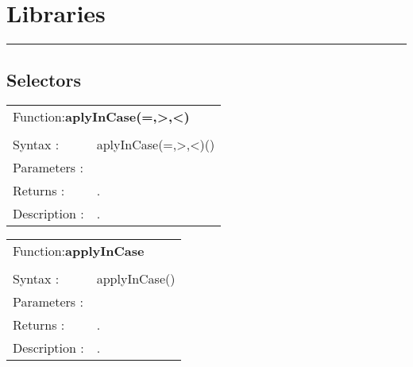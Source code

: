 \documentclass[a4paper,11pt,oneside]{article}
\begin{document}
\vspace{1cm}
\sffamily
\newpage
\section{Libraries}


\vspace{5mm}
\rule{16cm}{2pt}
\subsection{Selectors}



\vspace{2mm}
\hline
\vspace{1mm}
\begin{tabular}{p{2.5cm} p{12cm}}
   
    \multicolumn{2}{l}{Function:\textbf{aplyInCase(=,>,<)}}\\
	 & \\
    Syntax : & aplyInCase(=,>,<)()\\
    Parameters : & 
\begin{itemize}

\end{itemize}\\
	
    Returns : & .\\
    Description : & .\\
\end{tabular}


\vspace{2mm}
\hline
\vspace{1mm}
\begin{tabular}{p{2.5cm} p{12cm}}
   
    \multicolumn{2}{l}{Function:\textbf{applyInCase}}\\
	 & \\
    Syntax : & applyInCase()\\
    Parameters : & 
\begin{itemize}

\end{itemize}\\
	
    Returns : & .\\
    Description : & .\\
\end{tabular}
\end{document}
